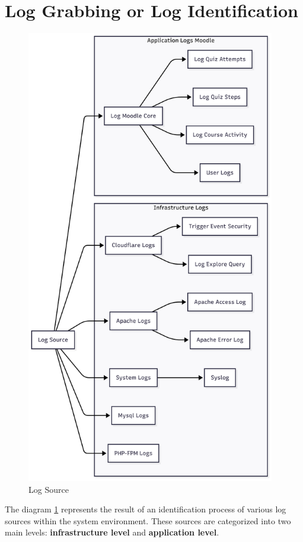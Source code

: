\section{Log Grabbing or Log Identification}
\begin{figure}[H] 
    \centering
    \includegraphics[height=20cm]{figure/log-source.png}
    \caption{Log Source}
    \label{fig:log-source}
\end{figure}
The diagram \ref{fig:log-source} represents the result of an identification process of various log sources within the system environment. These sources are categorized into two main levels: \textbf{infrastructure level} and \textbf{application level}.

